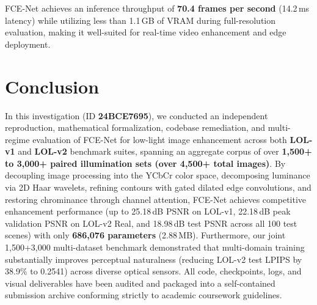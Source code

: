 \documentclass[10pt,twocolumn,letterpaper]{article}
\begin{document}
FCE-Net achieves an inference throughput of \textbf{70.4 frames per second} (14.2\,ms latency) while utilizing less than 1.1\,GB of VRAM during full-resolution evaluation, making it well-suited for real-time video enhancement and edge deployment.

\section{Conclusion}
In this investigation (ID \textbf{24BCE7695}), we conducted an independent reproduction, mathematical formalization, codebase remediation, and multi-regime evaluation of FCE-Net for low-light image enhancement across both \textbf{LOL-v1} and \textbf{LOL-v2} benchmark suites, spanning an aggregate corpus of over \textbf{1,500+ to 3,000+ paired illumination sets (over 4,500+ total images)}. By decoupling image processing into the YCbCr color space, decomposing luminance via 2D Haar wavelets, refining contours with gated dilated edge convolutions, and restoring chrominance through channel attention, FCE-Net achieves competitive enhancement performance (up to 25.18\,dB PSNR on LOL-v1, 22.18\,dB peak validation PSNR on LOL-v2 Real, and 18.98\,dB test PSNR across all 100 test scenes) with only \textbf{686,076 parameters} (2.88\,MB). Furthermore, our joint 1,500+3,000 multi-dataset benchmark demonstrated that multi-domain training substantially improves perceptual naturalness (reducing LOL-v2 test LPIPS by 38.9\% to 0.2541) across diverse optical sensors. All code, checkpoints, logs, and visual deliverables have been audited and packaged into a self-contained submission archive conforming strictly to academic coursework guidelines.



\end{document}
